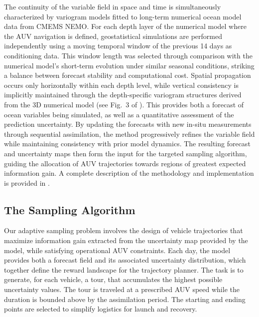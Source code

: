  
The continuity of the variable field in space and time is
simultaneously characterized by variogram models fitted to long-term
numerical ocean model data from CMEMS NEMO. For each depth
layer of the numerical model where the AUV navigation is defined,
geostatistical simulations are performed independently using a moving
temporal window of the previous 14 days as conditioning data. This
window length was selected through comparison with the numerical
model’s short-term evolution under similar seasonal conditions,
striking a balance between forecast stability and computational
cost. Spatial propagation occurs only horizontally within each depth
level, while vertical consistency is implicitly maintained through the
depth-specific variogram structures derived from the 3D numerical
model (see Fig.~3 of \cite{duarte2025}).  This provides both a
forecast of ocean variables being simulated, as well as a quantitative
assessment of the prediction uncertainty.  By updating the forecasts
with new in-situ measurements through sequential assimilation, the
method progressively refines the variable field while maintaining
consistency with prior model dynamics. The resulting forecast and
uncertainty maps then form the input for the targeted sampling
algorithm, guiding the allocation of AUV trajectories towards regions
of greatest expected information gain. A complete description of
  the methodology and implementation is provided in
  \cite{duarte2025}. 


\subsection{The Sampling Algorithm}

Our adaptive sampling problem involves the design of vehicle
trajectories that maximize information gain
\parencite{eidsvik2015,fossum18} extracted from the uncertainty map
provided by the model, while satisfying operational AUV
constraints. Each day, the model provides both a forecast field and
its associated uncertainty distribution, which together define the
reward landscape for the trajectory planner. The task is to generate,
for each vehicle, a tour, that accumulates the highest possible
uncertainty values. The tour is traveled at a prescribed AUV speed
while the duration is bounded above by the assimilation period. The
starting and ending points are selected to simplify logistics for
launch and recovery.

